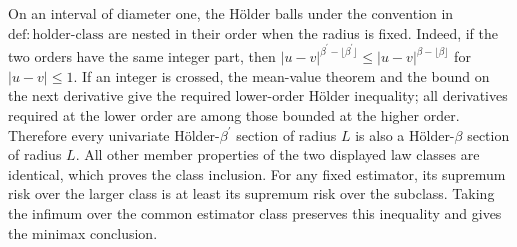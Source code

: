 On an interval of diameter one, the Hölder balls under the convention in \(\mathrm{def:holder\text{-}class}\) are nested in their order when the radius is fixed. Indeed, if the two orders have the same integer part, then \(\lvert u-v\rvert^{\beta^{\prime}-\lfloor\beta^{\prime}\rfloor}\le \lvert u-v\rvert^{\beta-\lfloor\beta\rfloor}\) for \(\lvert u-v\rvert\le1\). If an integer is crossed, the mean-value theorem and the bound on the next derivative give the required lower-order Hölder inequality; all derivatives required at the lower order are among those bounded at the higher order. Therefore every univariate Hölder-\(\beta^{\prime}\) section of radius \(L\) is also a Hölder-\(\beta\) section of radius \(L\). All other member properties of the two displayed law classes are identical, which proves the class inclusion. For any fixed estimator, its supremum risk over the larger class is at least its supremum risk over the subclass. Taking the infimum over the common estimator class preserves this inequality and gives the minimax conclusion.